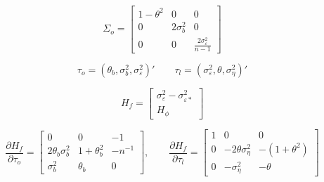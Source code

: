 \begin{equation}
    \label{eq:Sigma_o_phi_zero}
    \Sigma_o = \left[ \begin{array}{ccc}
        1-\theta^2 & 0 & 0  \\
        0  & 2\sigma_b^2 & 0 \\
        0 & 0 & \frac{2\sigma_\varepsilon^2}{n-1}
    \end{array} \right]
\end{equation}

$$ \tau_o = (\theta_b, \sigma_b^2, \sigma_\varepsilon^2)' \qquad \tau_l = (\sigma_\varepsilon^2,\theta,\sigma_\eta^2)' $$

$$ H_f = \left[\begin{array}{c}
     \sigma_\varepsilon^2 - \sigma_{\varepsilon*}^2  \\
      H_\phi
\end{array}\right] $$

$$ \frac{\partial H_f}{\partial \tau_o} = \left[ \begin{array}{ccc}
    0 & 0 & -1 \\
    2\theta_b\sigma_b^2 & 1 + \theta_b^2 & -n^{-1} \\
    \sigma_b^2 & \theta_b & 0
\end{array}\right], \qquad \frac{\partial H_f}{\partial \tau_l} = \left[ \begin{array}{ccc}
    1 & 0 & 0 \\
    0 & -2\theta\sigma_\eta^2 & -(1+\theta^2) \\
    0& -\sigma_\eta^2 & -\theta
\end{array}\right] $$





